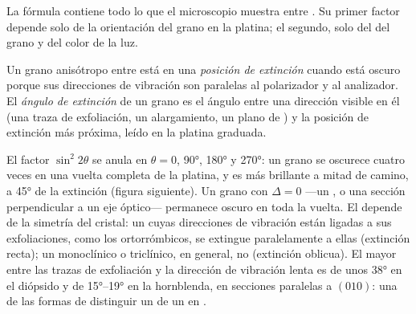 La fórmula contiene todo lo que el microscopio muestra entre . Su primer factor depende solo de la
orientación del grano en la platina; el segundo, solo del  del grano y del color de la luz.

\begin{definition}\label{def:b1:optical-mineralogy:extinction}
Un grano anisótropo entre  está en una \emph{posición de extinción}
cuando está oscuro porque sus direcciones de vibración son paralelas al polarizador y al analizador. El
\emph{ángulo de extinción} de un grano es el ángulo entre una dirección visible en él
(una traza de exfoliación, un alargamiento, un plano de ) y la posición de extinción más próxima, leído en la
platina graduada.
\end{definition}

El factor $\sin^2 2\theta$ se anula en $\theta = 0$, \ang{90}, \ang{180} y \ang{270}: un grano se oscurece cuatro
veces en una vuelta completa de la platina, y es más brillante a mitad de camino, a \ang{45} de la extinción (figura
siguiente). Un grano con $\Delta = 0$ ---un , o una sección perpendicular a un eje óptico---
permanece oscuro en toda la vuelta. El  depende de la simetría del cristal: un  cuyas
direcciones de vibración están ligadas a sus exfoliaciones, como los  ortorrómbicos, se extingue paralelamente
a ellas (extinción recta); un monoclínico o triclínico, en general, no (extinción oblicua). El mayor  entre las trazas de exfoliación y la dirección de vibración lenta es de unos \ang{38} en el diópsido y de
\ang{15}--\ang{19} en la hornblenda, en secciones paralelas a $(010)$: una de las formas de distinguir un  de
un  en .


